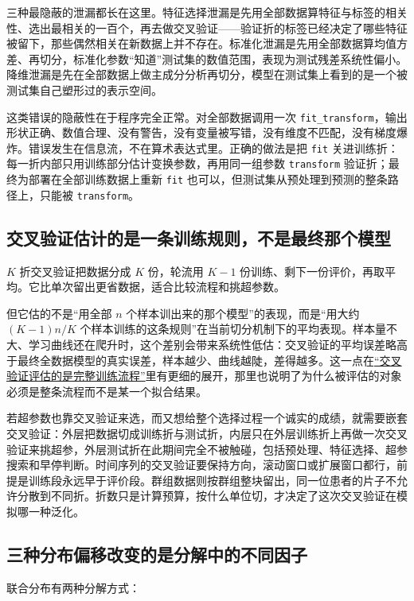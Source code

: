 三种最隐蔽的泄漏都长在这里。特征选择泄漏是先用全部数据算特征与标签的相关性、选出最相关的一百个，再去做交叉验证——验证折的标签已经决定了哪些特征被留下，那些偶然相关在新数据上并不存在。标准化泄漏是先用全部数据算均值方差、再切分，标准化参数``知道''测试集的数值范围，表现为测试残差系统性偏小。降维泄漏是先在全部数据上做主成分分析再切分，模型在测试集上看到的是一个被测试集自己塑形过的表示空间。

这类错误的隐蔽性在于程序完全正常。对全部数据调用一次 \texttt{fit\_transform}，输出形状正确、数值合理、没有警告，没有变量被写错，没有维度不匹配，没有梯度爆炸。错误发生在信息流，不在算术表达式里。正确的做法是把 \texttt{fit} 关进训练折：每一折内部只用训练部分估计变换参数，再用同一组参数 \texttt{transform} 验证折；最终为部署在全部训练数据上重新 \texttt{fit} 也可以，但测试集从预处理到预测的整条路径上，只能被 \texttt{transform}。

\subsection{交叉验证估计的是一条训练规则，不是最终那个模型}

\(K\) 折交叉验证把数据分成 \(K\) 份，轮流用 \(K-1\) 份训练、剩下一份评价，再取平均。它比单次留出更省数据，适合比较流程和挑超参数。

但它估的不是``用全部 \(n\) 个样本训出来的那个模型''的表现，而是``用大约 \((K-1)n/K\) 个样本训练的这条规则''在当前切分机制下的平均表现。样本量不大、学习曲线还在爬升时，这个差别会带来系统性低估：交叉验证的平均误差略高于最终全数据模型的真实误差，样本越少、曲线越陡，差得越多。这一点在\hyperref[sec:11-Mathematical-Statistics/06-Resampling-and-Model-Selection/03]{``交叉验证评估的是完整训练流程''}里有更细的展开，那里也说明了为什么被评估的对象必须是整条流程而不是某一个拟合结果。

若超参数也靠交叉验证来选，而又想给整个选择过程一个诚实的成绩，就需要嵌套交叉验证：外层把数据切成训练折与测试折，内层只在外层训练折上再做一次交叉验证来挑超参，外层测试折在此期间完全不被触碰，包括预处理、特征选择、超参搜索和早停判断。时间序列的交叉验证要保持方向，滚动窗口或扩展窗口都行，前提是训练段永远早于评价段。群组数据则按群组整块留出，同一位患者的片子不允许分散到不同折。折数只是计算预算，按什么单位切，才决定了这次交叉验证在模拟哪一种泛化。

\subsection{三种分布偏移改变的是分解中的不同因子}

联合分布有两种分解方式：

